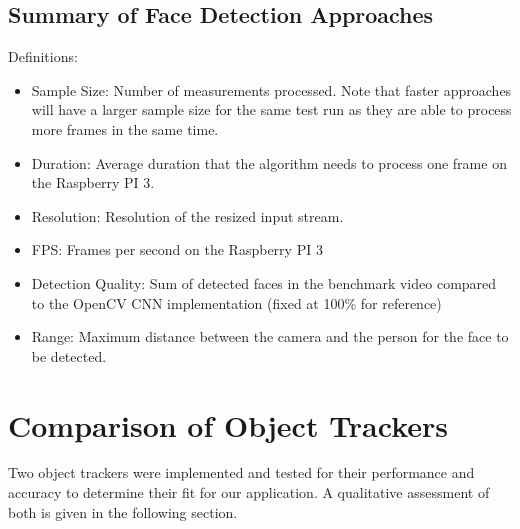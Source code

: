 \subsection{Summary of Face Detection Approaches}
\begin{table}[H]
    \caption[Face Detection Benchmark Results]{Face Detection Benchmark Results}\label{tab:fdm}
\end{table}
Definitions:\\
\begin{itemize}
    \item Sample Size: Number of measurements processed. Note that faster approaches will have a larger sample size for the same test run as they are able to process more frames in the same time.
    \item Duration: Average duration that the algorithm needs to process one frame on the Raspberry PI 3.
    \item Resolution: Resolution of the resized input stream.
    \item FPS: Frames per second on the Raspberry PI 3
    \item Detection Quality: Sum of detected faces in the benchmark video compared to the OpenCV CNN implementation (fixed at 100\% for reference)
    \item Range: Maximum distance between the camera and the person for the face to be detected.\\
\end{itemize}
\section{Comparison of Object Trackers}
Two object trackers were implemented and tested for their performance and accuracy to determine their fit for our application. A qualitative assessment of both is given in the following section.
